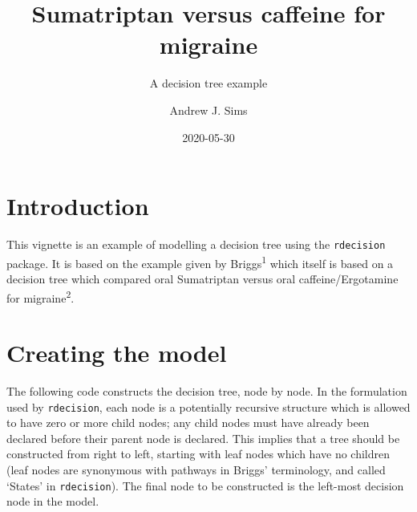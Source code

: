 \documentclass[]{article}
\title{Sumatriptan versus caffeine for migraine}
\subtitle{A decision tree example}
\author{Andrew J. Sims}
\date{2020-05-30}
\begin{document}
\maketitle

\hypertarget{introduction}{%
\section{Introduction}\label{introduction}}

This vignette is an example of modelling a decision tree using the
\texttt{rdecision} package. It is based on the example given by
Briggs\textsuperscript{1} which itself is based on a decision tree which
compared oral Sumatriptan versus oral caffeine/Ergotamine for
migraine\textsuperscript{2}.

\hypertarget{creating-the-model}{%
\section{Creating the model}\label{creating-the-model}}

The following code constructs the decision tree, node by node. In the
formulation used by \texttt{rdecision}, each node is a potentially
recursive structure which is allowed to have zero or more child nodes;
any child nodes must have already been declared before their parent node
is declared. This implies that a tree should be constructed from right
to left, starting with leaf nodes which have no children (leaf nodes are
synonymous with pathways in Briggs' terminology, and called `States' in
\texttt{rdecision}). The final node to be constructed is the left-most
decision node in the model.
\end{document}

